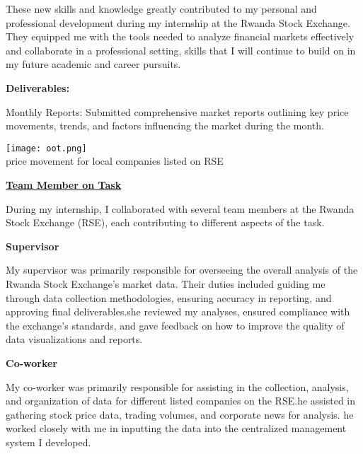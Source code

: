 \documentclass{article}
\begin{document}
\begin{titlepage}
\begin{titlepage}
\begin{flushleft}
\begin{flushleft}
\begin{itemize}
    These new skills and knowledge greatly contributed to my personal and professional development during my internship at the Rwanda Stock Exchange. They equipped me with the tools needed to analyze financial markets effectively and collaborate in a professional setting, skills that I will continue to build on in my future academic and career pursuits.
\end{itemize}

\vspace{0.5cm}

    \textbf{Deliverables:}

    Monthly Reports: Submitted comprehensive market reports outlining key price movements, trends, and factors influencing the market during the month.\\
    
 \vspace{0.5cm}

 \begin{center}
     

    \texttt{[image: oot.png]}
    \\
     \caption{price movement for local companies listed on RSE}
      \end{center} 
\vspace{0.6cm}

\textbf{\underline{Team Member on Task}}
\vspace{0.2cm}

During my internship, I collaborated with several team members at the Rwanda Stock Exchange (RSE), each contributing to different aspects of the task. 
\vspace{0.2cm}

\textbf{Supervisor }
\vspace{0.2cm}

My supervisor was primarily responsible for overseeing the overall analysis of the Rwanda Stock Exchange's market data. Their duties included guiding me through data collection methodologies, ensuring accuracy in reporting, and approving final deliverables.she reviewed my analyses, ensured compliance with the exchange's standards, and gave feedback on how to improve the quality of data visualizations and reports.
\vspace{0.2cm}

\textbf{Co-worker}
\vspace{0.2cm}

My co-worker was primarily responsible for assisting in the collection, analysis, and organization of data for different listed companies on the RSE.he assisted in gathering stock price data, trading volumes, and corporate news for analysis. he worked closely with me in inputting the data into the centralized management system I developed.
\vspace{0.2cm}


\end{flushleft}
\end{flushleft}
\end{titlepage}
\end{titlepage}
\end{document}

